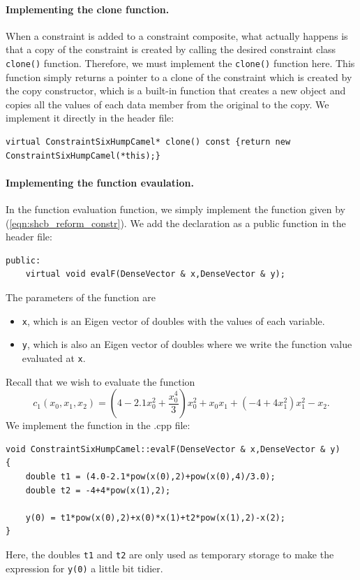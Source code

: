 \paragraph{Implementing the clone function.} When a constraint is added to a constraint composite, what actually happens is that a copy of the constraint is created by calling the desired constraint class \texttt{clone()} function. Therefore, we must implement the \texttt{clone()} function here. This function simply returns a pointer to a clone of the constraint which is created by the copy constructor, which is a built-in function that creates a new object and copies all the values of each data member from the original to the copy. We implement it directly in the header file:
\begin{lstlisting}
virtual ConstraintSixHumpCamel* clone() const {return new ConstraintSixHumpCamel(*this);}
\end{lstlisting}

\paragraph{Implementing the function evaulation.} In the function evaluation function, we simply implement the function given by (\ref{eqn:shcb_reform_constr}). We add the declaration as a public function in the header file:
\begin{lstlisting}
public:
	virtual void evalF(DenseVector & x,DenseVector & y);
\end{lstlisting}
The parameters of the function are
\begin{itemize}
\item
\texttt{x}, which is an Eigen vector of doubles with the values of each variable.
\item
\texttt{y}, which is also an Eigen vector of doubles where we write the function value evaluated at \texttt{x}.
\end{itemize}
Recall that we wish to evaluate the function
\[
c_1(x_0, x_1, x_2) = \left( 4 - 2.1x_0^2 + \frac{x_0^4}{3} \right)x_0^2 + x_0x_1 + (-4 + 4x_1^2) x_1^2 - x_2.
\]
We implement the function in the .cpp file:
\begin{lstlisting}
void ConstraintSixHumpCamel::evalF(DenseVector & x,DenseVector & y)
{
	double t1 = (4.0-2.1*pow(x(0),2)+pow(x(0),4)/3.0);
	double t2 = -4+4*pow(x(1),2);

	y(0) = t1*pow(x(0),2)+x(0)*x(1)+t2*pow(x(1),2)-x(2);
}
\end{lstlisting}
Here, the doubles \texttt{t1} and \texttt{t2} are only used as temporary storage to make the expression for \texttt{y(0)} a little bit tidier.


